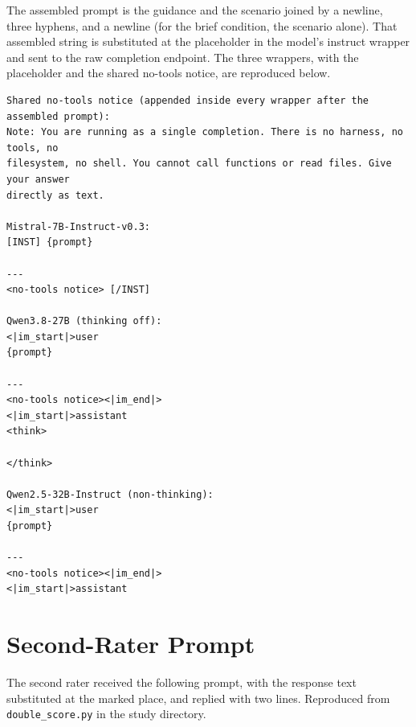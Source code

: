 \documentclass[11pt,a4paper]{article}
\begin{document}
The assembled prompt is the guidance and the scenario joined by a newline, three hyphens,
and a newline (for the brief condition, the scenario alone). That assembled string is
substituted at the placeholder in the model's instruct wrapper and sent to the raw
completion endpoint. The three wrappers, with the placeholder and the shared no-tools
notice, are reproduced below.

\begin{footnotesize}
\begin{verbatim}
Shared no-tools notice (appended inside every wrapper after the assembled prompt):
Note: You are running as a single completion. There is no harness, no tools, no
filesystem, no shell. You cannot call functions or read files. Give your answer
directly as text.

Mistral-7B-Instruct-v0.3:
[INST] {prompt}

---
<no-tools notice> [/INST]

Qwen3.8-27B (thinking off):
<|im_start|>user
{prompt}

---
<no-tools notice><|im_end|>
<|im_start|>assistant
<think>

</think>

Qwen2.5-32B-Instruct (non-thinking):
<|im_start|>user
{prompt}

---
<no-tools notice><|im_end|>
<|im_start|>assistant
\end{verbatim}
\end{footnotesize}

\section{Second-Rater Prompt}\label{app:rater}

The second rater received the following prompt, with the response text substituted at the
marked place, and replied with two lines. Reproduced from \texttt{double\_score.py} in the
study directory.
\end{document}
